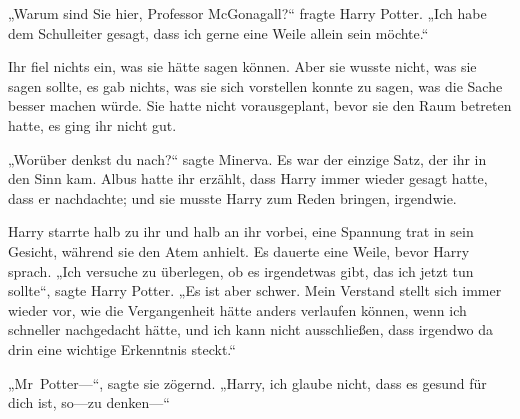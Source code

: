„Warum sind Sie hier, Professor McGonagall?“ fragte Harry Potter. „Ich habe dem Schulleiter gesagt, dass ich gerne eine Weile allein sein möchte.“

Ihr fiel nichts ein, was sie hätte sagen können. Aber sie wusste nicht, was sie sagen sollte, es gab nichts, was sie sich vorstellen konnte zu sagen, was die Sache besser machen würde. Sie hatte nicht vorausgeplant, bevor sie den Raum betreten hatte, es ging ihr nicht gut.

„Worüber denkst du nach?“ sagte Minerva.
Es war der einzige Satz, der ihr in den Sinn kam. Albus hatte ihr erzählt, dass Harry immer wieder gesagt hatte, dass er nachdachte; und sie musste Harry zum Reden bringen, irgendwie.



Harry starrte halb zu ihr und halb an ihr vorbei, eine Spannung trat in sein Gesicht, während sie den Atem anhielt. Es dauerte eine Weile, bevor Harry sprach. „Ich versuche zu überlegen, ob es irgendetwas gibt, das ich jetzt tun sollte“, sagte Harry Potter. „Es ist aber schwer. Mein Verstand stellt sich immer wieder vor, wie die Vergangenheit hätte anders verlaufen können, wenn ich schneller nachgedacht hätte, und ich kann nicht ausschließen, dass irgendwo da drin eine wichtige Erkenntnis steckt.“

„Mr~Potter—“, sagte sie zögernd. „Harry, ich glaube nicht, dass es gesund für dich ist, so—zu denken—“

